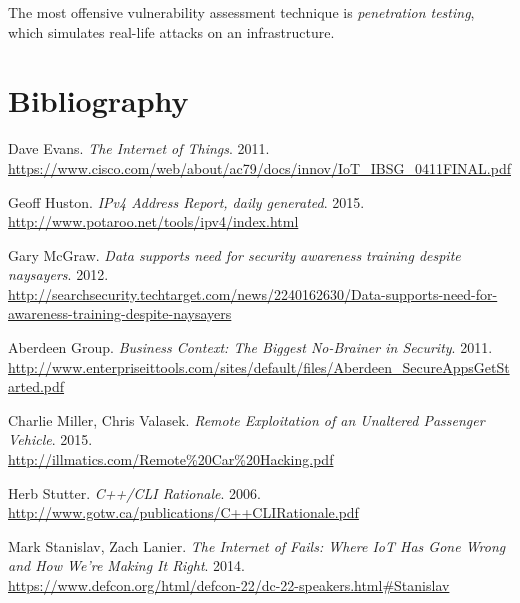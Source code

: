 \documentclass[a4paper,12pt]{article}
\begin{document}
	The most offensive vulnerability assessment technique is \textit{penetration testing}, which simulates real-life attacks on an infrastructure.
	
\newpage
\section{Bibliography}

	\begingroup
	\renewcommand{\section}[2]{}
	\begin{thebibliography}{}
		
		Dave Evans. \textit{The Internet of Things}. 2011.\\ \url{https://www.cisco.com/web/about/ac79/docs/innov/IoT\_IBSG\_0411FINAL.pdf}
		
		Geoff Huston. \textit{IPv4 Address Report, daily generated}. 2015.\\
		\url{http://www.potaroo.net/tools/ipv4/index.html}
		
		Gary McGraw. \textit{Data supports need for security awareness training despite naysayers}. 2012.\\
		\url{http://searchsecurity.techtarget.com/news/2240162630/Data-supports-need-for-awareness-training-despite-naysayers}
		
		Aberdeen Group. \textit{Business Context: The Biggest No-Brainer in Security}. 2011.\\
		\url{http://www.enterpriseittools.com/sites/default/files/Aberdeen_SecureAppsGetStarted.pdf}
		
		Charlie Miller, Chris Valasek. \textit{Remote Exploitation of an Unaltered Passenger Vehicle}. 2015.\\
		\url{http://illmatics.com/Remote\%20Car\%20Hacking.pdf}
		
		Herb Stutter. \textit{C++/CLI Rationale}. 2006.\\
		\url{http://www.gotw.ca/publications/C++CLIRationale.pdf}
		
		Mark Stanislav, Zach Lanier. \textit{The Internet of Fails: Where IoT Has Gone Wrong and How We're Making It Right}. 2014.\\
		\url{https://www.defcon.org/html/defcon-22/dc-22-speakers.html#Stanislav}
		

\end{thebibliography}
\end{document}
